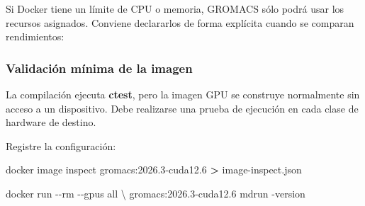 \documentclass[
  spanish,
  11pt,
  a4paper]{article}
\newenvironment{Shaded}{\begin{snugshade}}{\end{snugshade}}
\newcommand{\AttributeTok}[1]{\textcolor[rgb]{0.13,0.29,0.53}{#1}}
\newcommand{\DataTypeTok}[1]{\textcolor[rgb]{0.13,0.29,0.53}{#1}}
\newcommand{\ExtensionTok}[1]{#1}
\newcommand{\FunctionTok}[1]{\textcolor[rgb]{0.13,0.29,0.53}{\textbf{#1}}}
\newcommand{\NormalTok}[1]{#1}
\newcommand{\OperatorTok}[1]{\textcolor[rgb]{0.81,0.36,0.00}{\textbf{#1}}}
\newcommand{\StringTok}[1]{\textcolor[rgb]{0.31,0.60,0.02}{#1}}
\newcommand{\VariableTok}[1]{\textcolor[rgb]{0.00,0.00,0.00}{#1}}
\begin{document}
Si Docker tiene un límite de CPU o memoria, GROMACS sólo podrá usar los
recursos asignados. Conviene declararlos de forma explícita cuando se
comparan rendimientos:

\begin{Shaded}
\end{Shaded}

\subsubsection{Validación mínima de la
imagen}\label{validaciuxf3n-muxednima-de-la-imagen}

La compilación ejecuta \textbf{ctest}, pero la imagen GPU se construye
normalmente sin acceso a un dispositivo. Debe realizarse una prueba de
ejecución en cada clase de hardware de destino.

Registre la configuración:

\begin{Shaded}
\begin{Highlighting}[]
\ExtensionTok{docker}\NormalTok{ image inspect gromacs:2026.3{-}cuda12.6 }\OperatorTok{\textgreater{}}\NormalTok{ image{-}inspect.json}

\ExtensionTok{docker}\NormalTok{ run }\AttributeTok{{-}{-}rm} \AttributeTok{{-}{-}gpus}\NormalTok{ all }\DataTypeTok{\textbackslash{}}
\NormalTok{  gromacs:2026.3{-}cuda12.6 mdrun }\AttributeTok{{-}version}
\end{Highlighting}
\end{Shaded}
\end{document}
